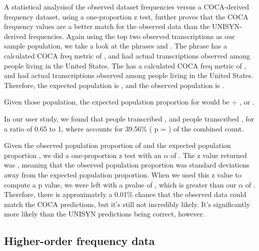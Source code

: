 

A statistical analysisof the observed dataset frequencies versus a COCA-derived frequency dataset, using a one-proportion z test, further proves that the COCA frequency values are a better match for the observed data than the UNISYN-derived frequencies.  Again using the top two observed transcriptions as our sample population, we take a look at the phrases \phraseOne and \phraseTwo.  The phrase \phraseOne has a calculated COCA freq metric of \cocaFreqForPhraseOne, and had \USATranscriptionsOfPhraseOne actual transcriptions observed among people living in the United States. The \phraseTwo has a calculated COCA freq metric of \cocaFreqForPhraseTwo, and had \USATranscriptionsOfPhraseTwo actual transcriptions observed among people living in the United States. Therefore, the expected population is \cocaCombinedFreq, and the observed population is \USACombinedTranscriptions.  

Given those population, the expected population proportion for \phraseOne would be \cocaFreqForPhraseOne  $\div$ \cocaCombinedFreq, or \expectedProportionOfPhraseOneOccurancesCOCA.  

In our user study, we found that \USATranscriptionsOfPhraseOne people transcribed \phraseOne, and \USATranscriptionsOfPhraseTwo people transcribed \phraseTwo, for a ratio of 0.65 to 1, where \phraseOne accounts for 39.56\% ( p = \observedProportionOfPhraseOneOccurances ) of the combined count. 

Given the observed population proportion of \observedProportionOfPhraseOneOccurances and the expected population proportion \expectedProportionOfPhraseOneOccurancesCOCA, we did a one-proportion z test with an $\alpha$ of \alphaSigFigs.  The z value returned was \COCAzVal, meaning that the observed population proportion was \COCAzVal standard deviations away from the expected population proportion.  When we used this z value to compute a p value, we were left with a pvalue of \pvalueCOCA, which is greater than our $\alpha$ of \alphaSigFigs. Therefore, there is approximately a 0.01\% chance that the observed data could match the COCA predictions, but it's still not incredibly likely. It's significantly more likely than the UNISYN predictions being correct, however.



\subsection{Higher-order frequency data}
\label{subsection:HigherOrderFrequencyData}

